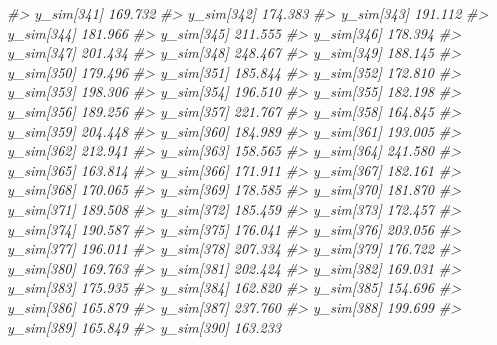 \documentclass[
  10pt,
  italian,
  a4paper,
  extrafontsizes,onecolumn,openright
  ]{memoir}
\newenvironment{Shaded}{\begin{snugshade}}{\end{snugshade}}
\newcommand{\CommentTok}[1]{\textcolor[rgb]{0.56,0.35,0.01}{\textit{#1}}}
\begin{document}
\begin{Shaded}
\begin{Highlighting}[]
\CommentTok{\#\textgreater{}   y\_sim[341] 169.732}
\CommentTok{\#\textgreater{}   y\_sim[342] 174.383}
\CommentTok{\#\textgreater{}   y\_sim[343] 191.112}
\CommentTok{\#\textgreater{}   y\_sim[344] 181.966}
\CommentTok{\#\textgreater{}   y\_sim[345] 211.555}
\CommentTok{\#\textgreater{}   y\_sim[346] 178.394}
\CommentTok{\#\textgreater{}   y\_sim[347] 201.434}
\CommentTok{\#\textgreater{}   y\_sim[348] 248.467}
\CommentTok{\#\textgreater{}   y\_sim[349] 188.145}
\CommentTok{\#\textgreater{}   y\_sim[350] 179.496}
\CommentTok{\#\textgreater{}   y\_sim[351] 185.844}
\CommentTok{\#\textgreater{}   y\_sim[352] 172.810}
\CommentTok{\#\textgreater{}   y\_sim[353] 198.306}
\CommentTok{\#\textgreater{}   y\_sim[354] 196.510}
\CommentTok{\#\textgreater{}   y\_sim[355] 182.198}
\CommentTok{\#\textgreater{}   y\_sim[356] 189.256}
\CommentTok{\#\textgreater{}   y\_sim[357] 221.767}
\CommentTok{\#\textgreater{}   y\_sim[358] 164.845}
\CommentTok{\#\textgreater{}   y\_sim[359] 204.448}
\CommentTok{\#\textgreater{}   y\_sim[360] 184.989}
\CommentTok{\#\textgreater{}   y\_sim[361] 193.005}
\CommentTok{\#\textgreater{}   y\_sim[362] 212.941}
\CommentTok{\#\textgreater{}   y\_sim[363] 158.565}
\CommentTok{\#\textgreater{}   y\_sim[364] 241.580}
\CommentTok{\#\textgreater{}   y\_sim[365] 163.814}
\CommentTok{\#\textgreater{}   y\_sim[366] 171.911}
\CommentTok{\#\textgreater{}   y\_sim[367] 182.161}
\CommentTok{\#\textgreater{}   y\_sim[368] 170.065}
\CommentTok{\#\textgreater{}   y\_sim[369] 178.585}
\CommentTok{\#\textgreater{}   y\_sim[370] 181.870}
\CommentTok{\#\textgreater{}   y\_sim[371] 189.508}
\CommentTok{\#\textgreater{}   y\_sim[372] 185.459}
\CommentTok{\#\textgreater{}   y\_sim[373] 172.457}
\CommentTok{\#\textgreater{}   y\_sim[374] 190.587}
\CommentTok{\#\textgreater{}   y\_sim[375] 176.041}
\CommentTok{\#\textgreater{}   y\_sim[376] 203.056}
\CommentTok{\#\textgreater{}   y\_sim[377] 196.011}
\CommentTok{\#\textgreater{}   y\_sim[378] 207.334}
\CommentTok{\#\textgreater{}   y\_sim[379] 176.722}
\CommentTok{\#\textgreater{}   y\_sim[380] 169.763}
\CommentTok{\#\textgreater{}   y\_sim[381] 202.424}
\CommentTok{\#\textgreater{}   y\_sim[382] 169.031}
\CommentTok{\#\textgreater{}   y\_sim[383] 175.935}
\CommentTok{\#\textgreater{}   y\_sim[384] 162.820}
\CommentTok{\#\textgreater{}   y\_sim[385] 154.696}
\CommentTok{\#\textgreater{}   y\_sim[386] 165.879}
\CommentTok{\#\textgreater{}   y\_sim[387] 237.760}
\CommentTok{\#\textgreater{}   y\_sim[388] 199.699}
\CommentTok{\#\textgreater{}   y\_sim[389] 165.849}
\CommentTok{\#\textgreater{}   y\_sim[390] 163.233}

\end{Highlighting}
\end{Shaded}
\end{document}

